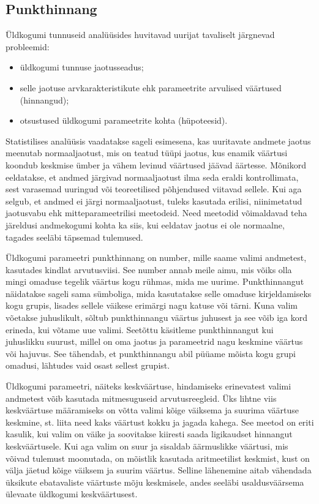 \documentclass[
]{book}
\providecommand{\tightlist}{%
  \setlength{\itemsep}{0pt}\setlength{\parskip}{0pt}}
\begin{document}
\subsection{Punkthinnang}\label{punkthinnang}

Üldkogumi tunnuseid analüüsides huvitavad uurijat tavaliselt järgnevad probleemid:

\begin{itemize}
\tightlist
\item
  üldkogumi tunnuse jaotusseadus;
\item
  selle jaotuse arvkarakteristikute ehk parameetrite arvulised väärtused (hinnangud);
\item
  otsustused üldkogumi parameetrite kohta (hüpoteesid).
\end{itemize}

Statistilises analüüsis vaadatakse sageli esimesena, kas uuritavate andmete jaotus meenutab normaaljaotust, mis on teatud tüüpi jaotus, kus enamik väärtusi koondub keskmise ümber ja vähem levinud väärtused jäävad äärtesse. Mõnikord eeldatakse, et andmed järgivad normaaljaotust ilma seda eraldi kontrollimata, sest varasemad uuringud või teoreetilised põhjendused viitavad sellele. Kui aga selgub, et andmed ei järgi normaaljaotust, tuleks kasutada erilisi, niinimetatud jaotusvabu ehk mitteparameetrilisi meetodeid. Need meetodid võimaldavad teha järeldusi andmekogumi kohta ka siis, kui eeldatav jaotus ei ole normaalne, tagades seeläbi täpsemad tulemused.

Üldkogumi parameetri punkthinnang on number, mille saame valimi andmetest, kasutades kindlat arvutusviisi. See number annab meile aimu, mis võiks olla mingi omaduse tegelik väärtus kogu rühmas, mida me uurime. Punkthinnangut näidatakse sageli sama sümboliga, mida kasutatakse selle omaduse kirjeldamiseks kogu grupis, lisades sellele väikese erimärgi nagu katuse või tärni. Kuna valim võetakse juhuslikult, sõltub punkthinnangu väärtus juhusest ja see võib iga kord erineda, kui võtame uue valimi. Seetõttu käsitleme punkthinnangut kui juhuslikku suurust, millel on oma jaotus ja parameetrid nagu keskmine väärtus või hajuvus. See tähendab, et punkthinnangu abil püüame mõista kogu grupi omadusi, lähtudes vaid osast sellest grupist.

Üldkogumi parameetri, näiteks keskväärtuse, hindamiseks erinevatest valimi andmetest võib kasutada mitmesuguseid arvutusreegleid. Üks lihtne viis keskväärtuse määramiseks on võtta valimi kõige väiksema ja suurima väärtuse keskmine, st. liita need kaks väärtust kokku ja jagada kahega. See meetod on eriti kasulik, kui valim on väike ja soovitakse kiiresti saada ligikaudset hinnangut keskväärtusele. Kui aga valim on suur ja sisaldab äärmuslikke väärtusi, mis võivad tulemust moonutada, on mõistlik kasutada aritmeetilist keskmist, kust on välja jäetud kõige väiksem ja suurim väärtus. Selline lähenemine aitab vähendada üksikute ebatavaliste väärtuste mõju keskmisele, andes seeläbi usaldusväärsema ülevaate üldkogumi keskväärtusest.
\end{document}
